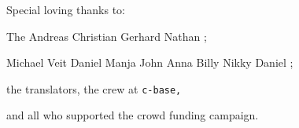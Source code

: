   Special loving thanks to:
  
  The  
  Andreas 
  Christian 
  Gerhard 
  Nathan ;
  
  Michael 
  Veit  
  Daniel 
  Manja  
  John  
  Anna  
  Billy  
  Nikky   
  Daniel ; 
  
  the translators, the crew at \texttt{c-base,} 
  
  and all who supported the crowd funding campaign.
  